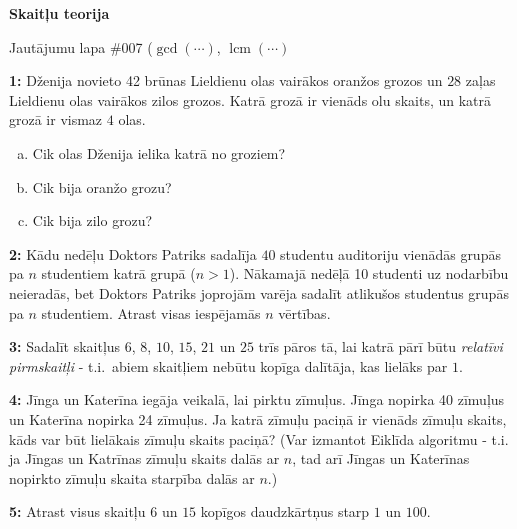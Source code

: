 \documentclass[11pt]{article}
\newenvironment{uzdevums}[1][\unskip]{%
\vspace{3mm}
\noindent
\textbf{#1:}
\noindent}
{}
\begin{document}
\begin{center}
{\LARGE \bf Skaitļu teorija}
\end{center}

\begin{center}
{\large Jautājumu lapa \#007 ($\operatorname{gcd}(\cdots)$, $\operatorname{lcm}(\cdots)$}
\end{center}


\begin{uzdevums}[1]
Dženija novieto 42 brūnas Lieldienu olas vairākos oranžos grozos un 
$28$ zaļas Lieldienu olas vairākos zilos grozos. Katrā grozā ir vienāds olu skaits, un katrā grozā ir 
vismaz $4$ olas. 
\begin{enumerate}[(a)]
\item Cik olas Dženija ielika katrā no groziem?
\item Cik bija oranžo grozu?
\item Cik bija zilo grozu?
\end{enumerate}
\end{uzdevums}


\begin{uzdevums}[2]
Kādu nedēļu Doktors Patriks sadalīja $40$ studentu auditoriju vienādās grupās pa $n$ studentiem katrā grupā
($n > 1$). Nākamajā nedēļā 10 studenti uz nodarbību neieradās, bet Doktors Patriks joprojām varēja 
sadalīt atlikušos studentus grupās pa $n$ studentiem. Atrast visas iespējamās $n$ vērtības. 
\end{uzdevums}

\begin{uzdevums}[3]
Sadalīt skaitļus $6$, $8$, $10$, $15$, $21$ un $25$ trīs pāros tā, lai katrā pārī 
būtu {\em relatīvi pirmskaitļi} - t.i.\ abiem skaitļiem nebūtu kopīga dalītāja, kas lielāks par $1$. 
\end{uzdevums}

\begin{uzdevums}[4]
Jīnga un Katerīna iegāja veikalā, lai pirktu zīmuļus. Jīnga nopirka 40 zīmuļus un Katerīna nopirka 24 zīmuļus. 
Ja katrā zīmuļu paciņā ir vienāds zīmuļu skaits, kāds var būt lielākais zīmuļu skaits paciņā? 
(Var izmantot Eiklīda algoritmu - t.i. ja Jīngas un Katrīnas zīmuļu skaits dalās ar $n$, 
tad arī Jīngas un Katerīnas nopirkto zīmuļu skaita starpība dalās ar $n$.) 
\end{uzdevums}

\begin{uzdevums}[5]
Atrast visus skaitļu $6$ un $15$ kopīgos daudzkārtņus starp $1$ un $100$. 
\end{uzdevums}
\end{document}

